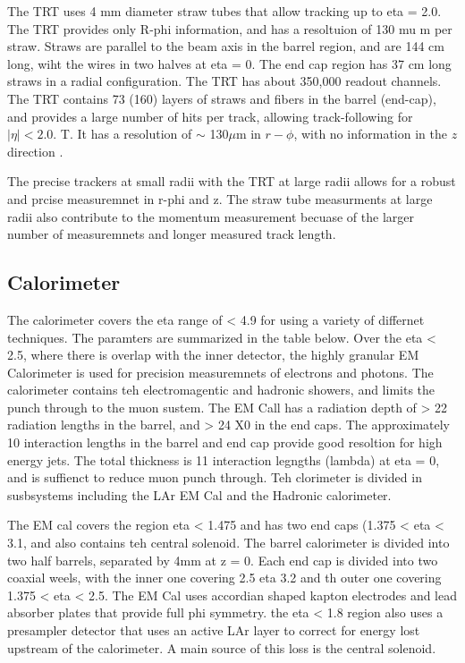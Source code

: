 The TRT uses 4 mm diameter straw tubes that allow tracking up to eta = 2.0. The TRT provides only R-phi information, and has a resoltuion of 130 mu m per straw. Straws are parallel to the beam axis in the barrel region, and are 144 cm long, wiht the wires in two halves at eta = 0. The end cap region has 37 cm long straws in a radial configuration. The TRT has about 350,000 readout channels. 
The TRT contains 73 (160) layers of straws and fibers in the barrel (end-cap), and provides a large number of hits per track, allowing track-following for $|\eta| <  2.0$. T. It has a resolution of $\sim$ 130$\mu$m in $r-\phi$, with no information in the $z$ direction \cite{Aad:2008zzm}.


The precise trackers at small radii with the TRT at large radii allows for a robust and prcise measuremnet in r-phi and z. The straw tube measurments at large radii also contribute to the momentum measurement becuase of the larger number of measuremnets and longer measured track length. 


\subsection{Calorimeter}
The calorimeter covers the eta range of < 4.9 for using a variety of differnet techniques. The paramters are summarized in the table below. Over the eta < 2.5, where there is overlap with the inner detector, the highly granular EM Calorimeter is used for precision measuremnets of electrons and photons. The calorimeter contains teh electromagentic and hadronic showers, and limits the punch through to the muon sustem. The EM Call has a radiation depth of > 22 radiation lengths in the barrel, and > 24 X0 in the end caps. The approximately 10 interaction lengths in the barrel and end cap provide good resoltion for high energy jets. The total thickness is 11 interaction legngths (lambda) at eta = 0, and is suffienct to reduce muon punch through. Teh clorimeter is divided in susbsystems including the LAr EM Cal and the Hadronic calorimeter.

The EM cal covers the region eta < 1.475 and has two end caps (1.375 < eta < 3.1, and also contains teh central solenoid. The barrel calorimeter is divided into two half barrels, separated by 4mm at z = 0. Each end cap is divided into two coaxial weels, with the inner one covering 2.5 eta 3.2 and th outer one covering  1.375 < eta < 2.5. The EM Cal uses accordian shaped kapton electrodes and lead absorber plates that provide full phi symmetry. the eta < 1.8 region also uses a presampler detector that uses an active LAr layer to correct for energy lost upstream of the calorimeter. A main source of this loss is the central solenoid.

